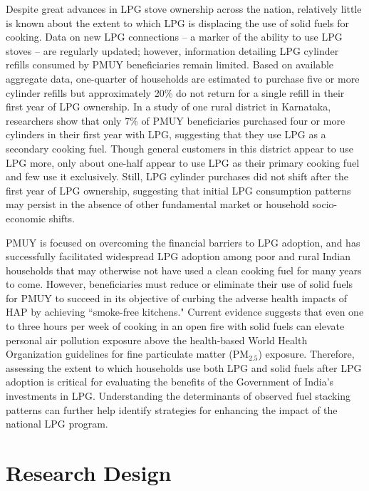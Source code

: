 \documentclass[11pt,english]{article}
\theoremstyle{plain} \newtheorem{claim}{Claim}
\theoremstyle{plain} \newtheorem{prop}{Proposition}
\theoremstyle{plain} \newtheorem{hypo}{Hypothesis}
\begin{document}
Despite great advances in LPG stove ownership across the nation, relatively little is known about the extent to which LPG is displacing the use of solid fuels for cooking. Data on new LPG connections -- a marker of the ability to use LPG stoves -- are regularly updated; however, information detailing LPG cylinder refills consumed by PMUY beneficiaries remain limited\citep{Dabadgeetal2018,MoPNG2019b}. Based on available aggregate data, one-quarter of households are estimated to purchase five or more cylinder refills but approximately 20\% do not return for a single refill in their first year of LPG ownership\citep{Karetal2019a,TheTimesIndia2019}. In a study of one rural district in Karnataka, researchers show that only 7\% of PMUY beneficiaries purchased four or more cylinders in their first year with LPG, suggesting that they use LPG as a secondary cooking fuel\citep{Karetal2019b}. Though general customers in this district appear to use LPG more, only about one-half appear to use LPG as their primary cooking fuel and few use it exclusively. Still, LPG cylinder purchases did not shift after the first year of LPG ownership, suggesting that initial LPG consumption patterns may persist in the absence of other fundamental market or household socio-economic shifts\citep{Karetal2019b}.

PMUY is focused on overcoming the financial barriers to LPG adoption, and has successfully facilitated widespread LPG adoption among poor and rural Indian households that may otherwise not have used a clean cooking fuel for many years to come. However, beneficiaries must reduce or eliminate their use of solid fuels for PMUY to succeed in its objective of curbing the adverse health impacts of HAP by achieving ``smoke-free kitchens." Current evidence suggests that even one to three hours per week of cooking in an open fire with solid fuels can elevate personal air pollution exposure above the health-based World Health Organization guidelines for fine particulate matter (PM$_{2.5}$) exposure\citep{JohnsonChiang2015}. Therefore, assessing the extent to which households use both LPG and solid fuels after LPG adoption is critical for evaluating the benefits of the Government of India's investments in LPG. Understanding the determinants of observed fuel stacking patterns can further help identify strategies for enhancing the impact of the national LPG program.

\section*{Research Design}
\end{document}
